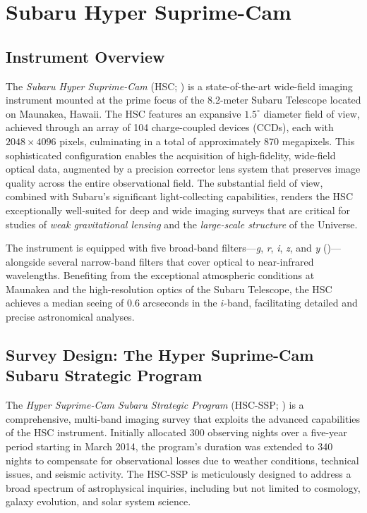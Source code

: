 \section{Subaru Hyper Suprime-Cam}

\subsection{Instrument Overview}

The \emph{Subaru Hyper Suprime-Cam} (HSC; \citealt{2018PASJ...70S...1M}) is a state-of-the-art wide-field imaging instrument mounted at the prime focus of the 8.2-meter Subaru Telescope located on Maunakea, Hawaii. The HSC features an expansive $1.5^\circ$ diameter field of view, achieved through an array of 104 charge-coupled devices (CCDs), each with $2048 \times 4096$ pixels, culminating in a total of approximately 870 megapixels. This sophisticated configuration enables the acquisition of high-fidelity, wide-field optical data, augmented by a precision corrector lens system that preserves image quality across the entire observational field. The substantial field of view, combined with Subaru's significant light-collecting capabilities, renders the HSC exceptionally well-suited for deep and wide imaging surveys that are critical for studies of \emph{weak gravitational lensing} and the \emph{large-scale structure} of the Universe.

The instrument is equipped with five broad-band filters—\textit{g}, \textit{r}, \textit{i}, \textit{z}, and \textit{y} (\citealt{2018PASJ...70...66K})—alongside several narrow-band filters that cover optical to near-infrared wavelengths. Benefiting from the exceptional atmospheric conditions at Maunakea and the high-resolution optics of the Subaru Telescope, the HSC achieves a median seeing of $0.6$ arcseconds in the $i$-band, facilitating detailed and precise astronomical analyses.

\subsection{Survey Design: The Hyper Suprime-Cam Subaru Strategic Program}

The \emph{Hyper Suprime-Cam Subaru Strategic Program} (HSC-SSP; \citealt{2018PASJ...70S...4A}) is a comprehensive, multi-band imaging survey that exploits the advanced capabilities of the HSC instrument. Initially allocated 300 observing nights over a five-year period starting in March 2014, the program's duration was extended to 340 nights to compensate for observational losses due to weather conditions, technical issues, and seismic activity. The HSC-SSP is meticulously designed to address a broad spectrum of astrophysical inquiries, including but not limited to cosmology, galaxy evolution, and solar system science.

